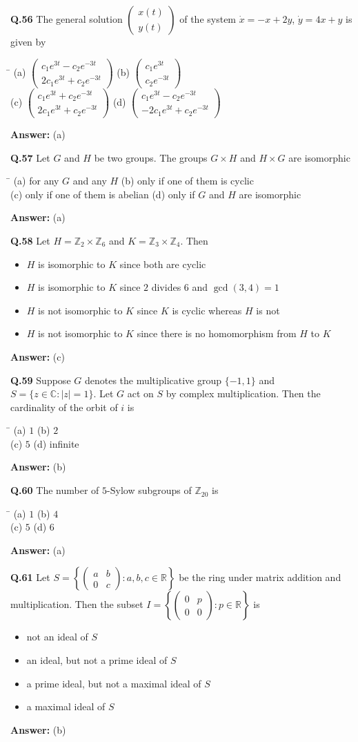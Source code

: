 \documentclass[11pt,a4paper]{article}
\newcommand{\optsfour}[4]{%
  \begin{tabbing}
    \hspace{0.48\linewidth}\=\kill
    (a) #1 \> (b) #2 \\[2pt]
    (c) #3 \> (d) #4
  \end{tabbing}%
}
\newcommand{\optslist}[4]{%
  \begin{itemize}
    \setlength{\itemsep}{2pt}\setlength{\parskip}{0pt}
    \item[(a)] #1
    \item[(b)] #2
    \item[(c)] #3
    \item[(d)] #4
  \end{itemize}%
}
\newcommand{\ans}[1]{\textbf{Answer:} #1\par\medskip}
\begin{document}
\textbf{Q.56} The general solution $\begin{pmatrix} x(t) \\ y(t) \end{pmatrix}$ of the system $\dot{x} = -x + 2y$, $\dot{y} = 4x + y$ is given by
\optsfour{$\begin{pmatrix} c_1 e^{3t} - c_2 e^{-3t} \\ 2c_1 e^{3t} + c_2 e^{-3t} \end{pmatrix}$}{$\begin{pmatrix} c_1 e^{3t} \\ c_2 e^{-3t} \end{pmatrix}$}{$\begin{pmatrix} c_1 e^{3t} + c_2 e^{-3t} \\ 2c_1 e^{3t} + c_2 e^{-3t} \end{pmatrix}$}{$\begin{pmatrix} c_1 e^{3t} - c_2 e^{-3t} \\ -2c_1 e^{3t} + c_2 e^{-3t} \end{pmatrix}$}
\ans{(a)}

\textbf{Q.57} Let $G$ and $H$ be two groups. The groups $G \times H$ and $H \times G$ are isomorphic
\optsfour{for any $G$ and any $H$}{only if one of them is cyclic}{only if one of them is abelian}{only if $G$ and $H$ are isomorphic}
\ans{(a)}

\textbf{Q.58} Let $H = \mathbb{Z}_2 \times \mathbb{Z}_6$ and $K = \mathbb{Z}_3 \times \mathbb{Z}_4$. Then
\optslist{$H$ is isomorphic to $K$ since both are cyclic}{$H$ is isomorphic to $K$ since $2$ divides $6$ and $\gcd(3,4) = 1$}{$H$ is not isomorphic to $K$ since $K$ is cyclic whereas $H$ is not}{$H$ is not isomorphic to $K$ since there is no homomorphism from $H$ to $K$}
\ans{(c)}

\textbf{Q.59} Suppose $G$ denotes the multiplicative group $\{-1, 1\}$ and $S = \{z \in \mathbb{C} : |z| = 1\}$. Let $G$ act on $S$ by complex multiplication. Then the cardinality of the orbit of $i$ is
\optsfour{$1$}{$2$}{$5$}{infinite}
\ans{(b)}

\textbf{Q.60} The number of $5$-Sylow subgroups of $\mathbb{Z}_{20}$ is
\optsfour{$1$}{$4$}{$5$}{$6$}
\ans{(a)}

\textbf{Q.61} Let $S = \left\{\begin{pmatrix} a & b \\ 0 & c \end{pmatrix} : a, b, c \in \mathbb{R}\right\}$ be the ring under matrix addition and multiplication. Then the subset $I = \left\{\begin{pmatrix} 0 & p \\ 0 & 0 \end{pmatrix} : p \in \mathbb{R}\right\}$ is
\optslist{not an ideal of $S$}{an ideal, but not a prime ideal of $S$}{a prime ideal, but not a maximal ideal of $S$}{a maximal ideal of $S$}
\ans{(b)}
\end{document}
